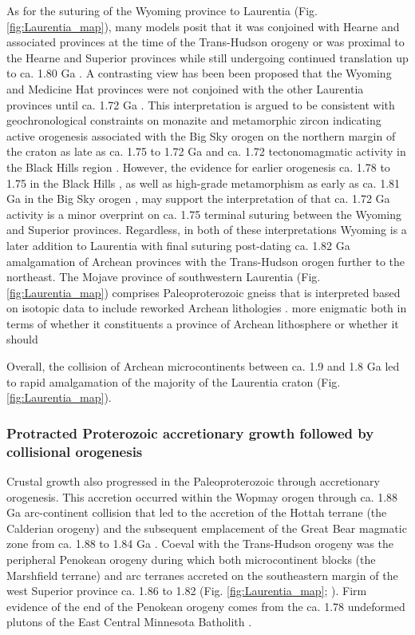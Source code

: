 \documentclass[twocolumn, switch]{article} %
\begin{document}
As for the suturing of the Wyoming province to Laurentia (Fig. \ref{fig:Laurentia_map}), many models posit that it was conjoined with Hearne and associated provinces at the time of the Trans-Hudson orogeny \citep[e.g.][]{St-Onge2009a, Pehrsson2015a} or was proximal to the Hearne and Superior provinces while still undergoing continued translation up to ca. 1.80 Ga \citep{Whitmeyer2007a}. A contrasting view has been been proposed that the Wyoming and Medicine Hat provinces were not conjoined with the other Laurentia provinces until ca. 1.72 Ga \citep{Kilian2016b}. This interpretation is argued to be consistent with geochronological constraints on monazite and metamorphic zircon indicating active orogenesis associated with the Big Sky orogen on the northern margin of the craton as late as ca. 1.75 to 1.72 Ga \citep{Condit2015a} and ca. 1.72 tectonomagmatic activity in the Black Hills region \citep{Redden1990a}. However, the evidence for earlier orogenesis ca. 1.78 to 1.75 in the Black Hills \citep{Dahl1999a, Hrncir2017a}, as well as high-grade metamorphism as early as ca. 1.81 Ga in the Big Sky orogen \citep{Condit2015a}, may support the interpretation of \citet{Hrncir2017a} that ca. 1.72 Ga activity is a minor overprint on ca. 1.75 terminal suturing between the Wyoming and Superior provinces. Regardless, in both of these interpretations Wyoming is a later addition to Laurentia with final suturing post-dating ca. 1.82 Ga amalgamation of Archean provinces with the Trans-Hudson orogen further to the northeast. The Mojave province of southwestern Laurentia (Fig. \ref{fig:Laurentia_map}) comprises Paleoproterozoic gneiss that is interpreted based on isotopic data to include reworked Archean lithologies \citep{Bennett1987a}. more enigmatic both in terms of whether it constituents a province of Archean lithosphere or whether it should  

Overall, the collision of Archean microcontinents between ca. 1.9 and 1.8 Ga led to rapid amalgamation of the majority of the Laurentia craton (Fig. \ref{fig:Laurentia_map}).

\subsubsection{Protracted Proterozoic accretionary growth followed by collisional orogenesis}

Crustal growth also progressed in the Paleoproterozoic through accretionary orogenesis. This accretion occurred within the Wopmay orogen through ca. 1.88 Ga arc-continent collision that led to the accretion of the Hottah terrane (the Calderian orogeny) and the subsequent emplacement of the Great Bear magmatic zone from ca. 1.88 to 1.84 Ga \citep{Hildebrand2009a}. Coeval with the Trans-Hudson orogeny was the peripheral Penokean orogeny during which both microcontinent blocks (the Marshfield terrane) and arc terranes accreted on the southeastern margin of the west Superior province ca. 1.86 to 1.82 (Fig. \ref{fig:Laurentia_map}; \citealp{Schulz2007a}). Firm evidence of the end of the Penokean orogeny comes from the ca. 1.78 undeformed plutons of the East Central Minnesota Batholith \citep{Holm2005a}.
\end{document}
